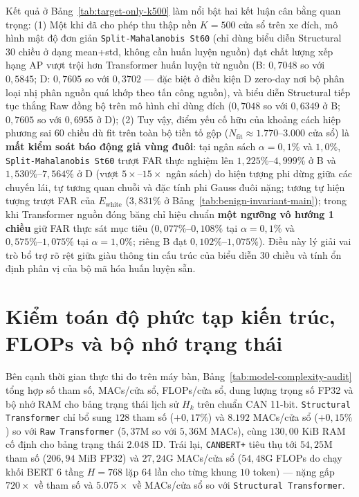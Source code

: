 \documentclass[12pt, a4paper, reqno, oneside]{book}
\DeclareRobustCommand{\code}[1]{\nolinkurl{#1}}
\begin{document}
{Kết quả ở Bảng~\ref{tab:target-only-k500} làm nổi bật hai kết luận cân bằng quan trọng: (1) Một khi đã cho phép thu thập nền $K=500$ cửa sổ trên xe đích, mô hình mật độ đơn giản \code{Split-Mahalanobis St60} (chỉ dùng biểu diễn Structural 30 chiều ở dạng mean+std, không cần huấn luyện nguồn) đạt chất lượng xếp hạng AP vượt trội hơn Transformer huấn luyện từ nguồn (B: $0{,}7048$ so với $0{,}5845$; D: $0{,}7605$ so với $0{,}3702$ --- đặc biệt ở điều kiện D zero-day nơi bộ phân loại nhị phân nguồn quá khớp theo tấn công nguồn), và biểu diễn Structural tiếp tục thắng Raw đồng bộ trên mô hình chỉ dùng đích ($0{,}7048$ so với $0{,}6349$ ở B; $0{,}7605$ so với $0{,}6955$ ở D); (2) Tuy vậy, điểm yếu cố hữu của khoảng cách hiệp phương sai 60 chiều dù fit trên toàn bộ tiền tố gộp ($N_{\text{fit}} \approx 1.770\text{--}3.000$ cửa sổ) là \textbf{mất kiểm soát báo động giả vùng đuôi}: tại ngân sách $\alpha=0{,}1\%$ và $1{,}0\%$, \code{Split-Mahalanobis St60} trượt FAR thực nghiệm lên $1{,}225\%\text{--}4{,}999\%$ ở B và $1{,}530\%\text{--}7{,}564\%$ ở D (vượt $5\times$--$15\times$ ngân sách) do hiện tượng phi dừng giữa các chuyến lái, tự tương quan chuỗi và đặc tính phi Gauss đuôi nặng; tương tự hiện tượng trượt FAR của $E_{\text{white}}$ ($3{,}831\%$ ở Bảng~\ref{tab:benign-invariant-main}); trong khi Transformer nguồn đóng băng chỉ hiệu chuẩn \textbf{một ngưỡng vô hướng 1 chiều} giữ FAR thực sát mục tiêu ($0{,}077\%\text{--}0{,}108\%$ tại $\alpha=0{,}1\%$ và $0{,}575\%\text{--}1{,}075\%$ tại $\alpha=1{,}0\%$; riêng B đạt $0{,}102\%\text{--}1{,}075\%$). Điều này lý giải vai trò bổ trợ rõ rệt giữa giàu thông tin cấu trúc của biểu diễn 30 chiều và tính ổn định phân vị của bộ mã hóa huấn luyện sẵn.

\section{Kiểm toán độ phức tạp kiến trúc, FLOPs và bộ nhớ trạng thái}\label{subsec:complexity-audit}
Bên cạnh thời gian thực thi đo trên máy bàn, Bảng~\ref{tab:model-complexity-audit} tổng hợp số tham số, MACs/cửa sổ, FLOPs/cửa sổ, dung lượng trọng số FP32 và bộ nhớ RAM cho bảng trạng thái lịch sử $H_k$ trên chuẩn CAN 11-bit. \code{Structural Transformer} chỉ bổ sung $128$ tham số ($+0{,}17\%$) và $8.192$ MACs/cửa sổ ($+0{,}15\%$) so với \code{Raw Transformer} ($5{,}37\text{M}$ so với $5{,}36\text{M}$ MACs), cùng $130{,}00\text{ KiB}$ RAM cố định cho bảng trạng thái 2.048 ID. Trái lại, \code{CANBERT+} tiêu thụ tới $54{,}25\text{M}$ tham số ($206{,}94\text{ MiB}$ FP32) và $27{,}24\text{G}$ MACs/cửa sổ ($54{,}48\text{G}$ FLOPs do chạy khối BERT 6 tầng $H=768$ lặp 64 lần cho từng khung $10$ token) — nặng gấp $720\times$ về tham số và $5.075\times$ về MACs/cửa sổ so với \code{Structural Transformer}.

}
\end{document}
